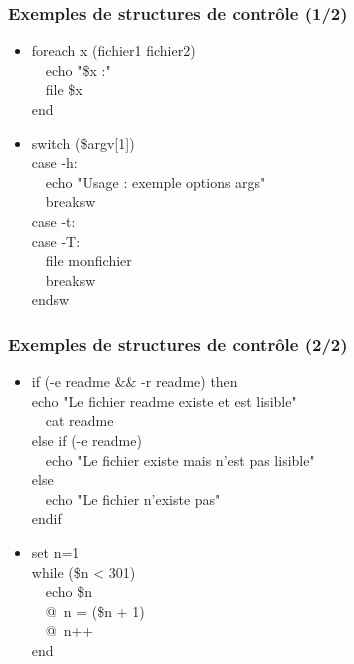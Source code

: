 \documentclass[handout,10pt]{beamer}
\begin{document}
\frame
{
    \frametitle{Exemples de structures de contrôle (1/2)}

    \begin{itemize}
        \item {\ttfamily foreach x (fichier1 fichier2) \\
                    ~~echo "\$x \string:" \\
                    ~~file \$x \\
                end\\
              }
        \item {\ttfamily switch (\$argv[1]) \\
                case -h\string:\\
                    ~~echo "Usage : exemple options args"\\
                    ~~breaksw\\
                case -t\string:\\
                case -T\string:\\
                    ~~file monfichier\\
                    ~~breaksw \\
                endsw\\
              }
    \end{itemize}
}


\frame
{
    \frametitle{Exemples de structures de contrôle (2/2)}

    \begin{itemize}
        \item {\ttfamily if (-e readme \&\& -r readme) then \\
                echo "Le fichier readme existe et est lisible"\\
                    ~~cat readme\\
                else if (-e readme)\\
                    ~~echo "Le fichier existe mais n'est pas lisible"\\
                else\\
                    ~~echo "Le fichier n'existe pas"\\
                endif\\
              }
        \item {\ttfamily set n=1\\
                while (\$n < 301)\\
                    ~~echo \$n\\
                    ~~@~n = (\$n + 1)\\
                    ~~@~n++\\
                end\\
              }
    \end{itemize}
}
\end{document}
